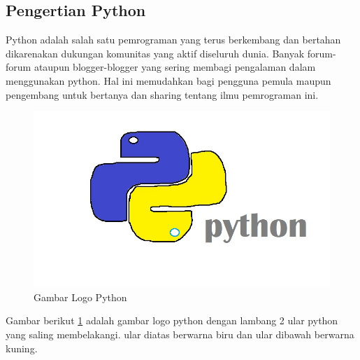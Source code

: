 \subsection{Pengertian Python}
Python adalah salah satu pemrograman yang terus berkembang dan bertahan dikarenakan dukungan komunitas yang aktif diseluruh dunia. Banyak forum-forum ataupun blogger-blogger yang sering membagi pengalaman dalam menggunakan python. Hal ini memudahkan bagi pengguna pemula maupun pengembang untuk bertanya dan sharing tentang ilmu pemrograman ini. 
\begin{figure} [ht]
	\centerline{\includegraphics[width=1\textwidth]{Plagiarisme/logopython.jpg}}
	\caption{Gambar Logo Python}
	\label{logopython}
	\end{figure}
Gambar berikut \ref{logopython} adalah gambar logo python dengan lambang 2 ular python yang saling membelakangi. ular diatas berwarna biru dan ular dibawah berwarna kuning. 


